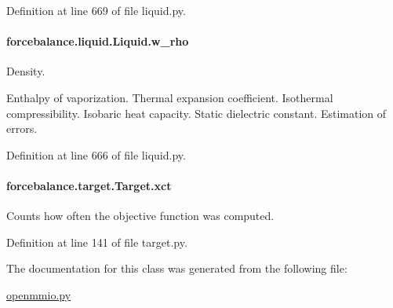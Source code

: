 Definition at line 669 of file liquid.\-py.

\hypertarget{classforcebalance_1_1liquid_1_1Liquid_aef8ad1dda086bde6f48130d273af9784}{
\paragraph[{w\-\_\-rho}]{\setlength{\rightskip}{0pt plus 5cm}forcebalance.\-liquid.\-Liquid.\-w\-\_\-rho\hspace{0.3cm}{\ttfamily [inherited]}}}\label{classforcebalance_1_1liquid_1_1Liquid_aef8ad1dda086bde6f48130d273af9784}


Density. 

Enthalpy of vaporization. Thermal expansion coefficient. Isothermal compressibility. Isobaric heat capacity. Static dielectric constant. Estimation of errors. 

Definition at line 666 of file liquid.\-py.

\hypertarget{classforcebalance_1_1target_1_1Target_aad2e385cfbf7b4a68f1c2cb41133fe82}{
\paragraph[{xct}]{\setlength{\rightskip}{0pt plus 5cm}forcebalance.\-target.\-Target.\-xct\hspace{0.3cm}{\ttfamily [inherited]}}}\label{classforcebalance_1_1target_1_1Target_aad2e385cfbf7b4a68f1c2cb41133fe82}


Counts how often the objective function was computed. 



Definition at line 141 of file target.\-py.



The documentation for this class was generated from the following file\-:\begin{DoxyCompactItemize}
\item 
\hyperlink{openmmio_8py}{openmmio.\-py}\end{DoxyCompactItemize}
